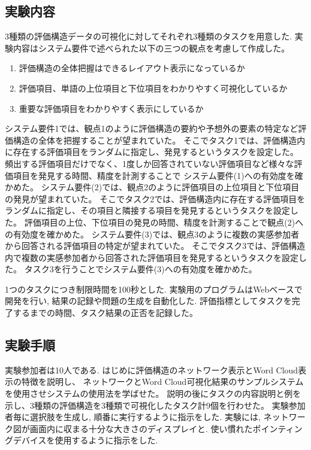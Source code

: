 \documentclass[syuuron]{kuee}
\begin{document}
		\subsection{実験内容}
			3種類の評価構造データの可視化に対してそれぞれ3種類のタスクを用意した. 
			実験内容はシステム要件で述べられた以下の三つの観点を考慮して作成した。
			\begin{enumerate}
				\item 評価構造の全体把握はできるレイアウト表示になっているか
				\item 評価項目、単語の上位項目と下位項目をわかりやすく可視化しているか
				\item 重要な評価項目をわかりやすく表示にしているか
			\end{enumerate}

			システム要件1では、観点1のように評価構造の要約や予想外の要素の特定など評価構造の全体を把握することが望まれていた。
			そこでタスク1では、評価構造内に存在する評価項目をランダムに指定し、発見するというタスクを設定した。
			頻出する評価項目だけでなく、1度しか回答されていない評価項目など様々な評価項目を発見する時間、精度を計測することで
			システム要件(1)への有効度を確かめた。
			システム要件(2)では、観点2のように評価項目の上位項目と下位項目の発見が望まれていた。
			そこでタスク2では、評価構造内に存在する評価項目をランダムに指定し、その項目と隣接する項目を発見するというタスクを設定した。
			評価項目の上位、下位項目の発見の時間、精度を計測することで観点(2)への有効度を確かめた。
			システム要件(3)では、観点3のように複数の実感参加者から回答される評価項目の特定が望まれていた。
			そこでタスク3では、評価構造内で複数の実感参加者から回答された評価項目を発見するというタスクを設定した。
			タスク3を行うことでシステム要件(3)への有効度を確かめた。
			
			1つのタスクにつき制限時間を100秒とした. 
			実験用のプログラムはWebベースで開発を行い, 結果の記録や問題の生成を自動化した. 
			評価指標としてタスクを完了するまでの時間、タスク結果の正否を記録した。
		
		\subsection{実験手順}
			実験参加者は10人である. 
			はじめに評価構造のネットワーク表示とWord Cloud表示の特徴を説明し、
			ネットワークとWord Cloud可視化結果のサンプルシステムを使用させシステムの使用法を学ばせた。
			説明の後にタスクの内容説明と例を示し、3種類の評価構造を3種類で可視化したタスク計9個を行わせた。
			実験参加者毎に選択肢を生成し, 順番に実行するように指示をした. 
			実験には, ネットワーク図が画面内に収まる十分な大きさのディスプレイと. 使い慣れたポインティングデバイスを使用するように指示をした. 
		
\end{document}
